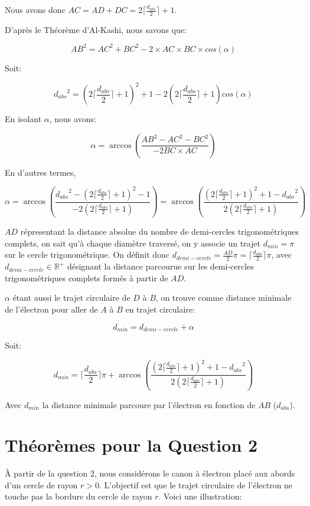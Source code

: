 \documentclass{amsart}
\theoremstyle{definition}
\theoremstyle{remark}
\numberwithin{equation}{section}
\begin{document}
Nous avons donc $AC=AD+DC=2\lceil\frac{d_{abs}}{2}\rceil+1$.

D'après le Théorème d'Al-Kashi, nous savons que:

\[AB^2=AC^2+BC^2-2\times AC \times BC \times cos(\alpha)\]

Soit:

\[{d_{abs}}^2=(2\lceil\frac{d_{abs}}{2}\rceil+1)^2 +1 -2(2\lceil\frac{d_{abs}}{2}\rceil+1) cos(\alpha)\]

En isolant $\alpha$, nous avons:

\[\alpha=\arccos(\frac{AB^2-AC^2-BC^2}{-2BC\times AC})\]

En d'autres termes,

\[\alpha=\arccos(\frac{{d_{abs}}^2 -(2\lceil\frac{d_{abs}}{2}\rceil+1)^2-1}{-2(2\lceil\frac{d_{abs}}{2}\rceil+1)})=\arccos(\frac{(2\lceil\frac{d_{abs}}{2}\rceil+1)^2+1 -{d_{abs}}^2}{2(2\lceil\frac{d_{abs}}{2}\rceil+1)})\]

$AD$ répresentant la distance absolue du nombre de demi-cercles trigonométriques complets, on sait qu'à chaque diamètre traversé, on y associe un trajet $d_{min}=\pi$ sur le cercle trigonométrique. On définit donc $d_{demi-cercle}=\frac{AD}{2}\pi=\lceil \frac{d_{abs}}{2} \rceil\pi$, avec $d_{demi-cercle}\in\mathbb{R^+}$ désignant la distance parcourue sur les demi-cercles trigonométriques complets formés à partir de $AD$.

$\alpha$ étant aussi le trajet circulaire de $D$ à $B$, on trouve comme distance minimale de l'électron pour aller de $A$ à $B$ en trajet circulaire:

\[d_{min}=d_{demi-cercle}+ \alpha\]

Soit:

\[d_{min}= \lceil\frac{d_{abs}}{2}\rceil\pi + \arccos(\frac{(2\lceil\frac{d_{abs}}{2}\rceil+1)^2+1 -{d_{abs}}^2}{2(2\lceil\frac{d_{abs}}{2}\rceil+1)})\]

Avec $d_{min}$ la distance minimale parcoure par l'électron en fonction de $AB$ ($d_{abs}$).

\section{Théorèmes pour la Question 2}

À partir de la question 2, nous considérons le canon à électron placé aux abords d'un cercle de rayon $r>0$. L'objectif est que le trajet circulaire de l'électron ne touche pas la bordure du cercle de rayon $r$. Voici une illustration:
\end{document}
